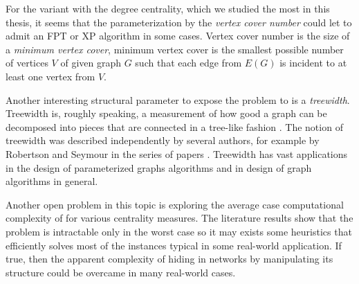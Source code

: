 For the variant with the degree centrality, which we studied the most in this thesis,
it seems that the parameterization by the \emph{vertex cover number} could let \HL to admit an FPT or XP algorithm in some cases.
Vertex cover number is the size of a \emph{minimum vertex cover},
minimum vertex cover is the smallest possible number of vertices $V$ of given graph $G$ such that each edge from $E(G)$ is incident
to at least one vertex from $V$.

Another interesting structural parameter to expose the problem to is a \emph{treewidth}.
Treewidth is, roughly speaking, a measurement of how good a graph can be decomposed into pieces that are connected in a
tree-like fashion \cite[p.~151]{Cygan2015}.
The notion of treewidth was described independently by several authors,
for example by Robertson and Seymour in the series of papers \cite{Robertson1984,Robertson1986.2,Robertson1986.5}. 
Treewidth has vast applications in the design of parameterized graphs algorithms and
in design of graph algorithms in general.

Another open problem in this topic is exploring the average case computational complexity of \HL for various centrality measures.
The literature results show that the problem is intractable only in the worst case so
it may exists some heuristics that efficiently solves most of the instances typical in some real-world application.
If true, then the apparent complexity of hiding in networks by manipulating its structure
could be overcame in many real-world cases.~\cite{Dey2019}

